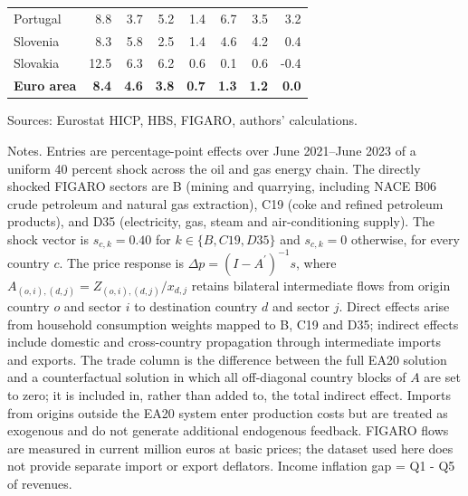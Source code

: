 \begin{table}[H]
\begin{tabular}{lrrrrrrr}
Portugal & 8.8 & 3.7 & 5.2 & 1.4 & 6.7 & 3.5 & 3.2
 \\
Slovenia & 8.3 & 5.8 & 2.5 & 1.4 & 4.6 & 4.2 & 0.4
 \\
Slovakia & 12.5 & 6.3 & 6.2 & 0.6 & 0.1 & 0.6 & -0.4
 \\
\midrule
\textbf{Euro area} & \textbf{8.4} & \textbf{4.6} & \textbf{3.8} & \textbf{0.7} & \textbf{1.3} & \textbf{1.2} & \textbf{0.0}
 \\
\bottomrule
\end{tabular}
\par\vspace{0.35em}\footnotesize\noindent Sources: Eurostat HICP, HBS, FIGARO, authors' calculations.
\par\vspace{0.25em}\footnotesize\noindent Notes. Entries are percentage-point effects over June 2021--June 2023 of a uniform 40 percent shock across the oil and gas energy chain. The directly shocked FIGARO sectors are B (mining and quarrying, including NACE B06 crude petroleum and natural gas extraction), C19 (coke and refined petroleum products), and D35 (electricity, gas, steam and air-conditioning supply). The shock vector is $s_{c,k}=0.40$ for $k\in\{B,C19,D35\}$ and $s_{c,k}=0$ otherwise, for every country $c$. The price response is $\Delta p = (I - A^{\prime})^{-1}s$, where $A_{(o,i),(d,j)}=Z_{(o,i),(d,j)}/x_{d,j}$ retains bilateral intermediate flows from origin country $o$ and sector $i$ to destination country $d$ and sector $j$. Direct effects arise from household consumption weights mapped to B, C19 and D35; indirect effects include domestic and cross-country propagation through intermediate imports and exports. The trade column is the difference between the full EA20 solution and a counterfactual solution in which all off-diagonal country blocks of $A$ are set to zero; it is included in, rather than added to, the total indirect effect. Imports from origins outside the EA20 system enter production costs but are treated as exogenous and do not generate additional endogenous feedback. FIGARO flows are measured in current million euros at basic prices; the dataset used here does not provide separate import or export deflators. Income inflation gap = Q1 - Q5 of revenues.
\end{table}
\vspace{0.6em}
